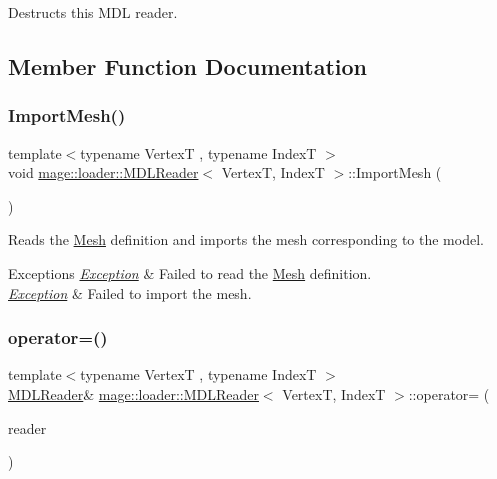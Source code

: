 Destructs this M\+DL reader. 

\subsection{Member Function Documentation}
\hypertarget{classmage_1_1loader_1_1_m_d_l_reader_a70ea21ef9309a867303875ad5b7669dc}{}\label{classmage_1_1loader_1_1_m_d_l_reader_a70ea21ef9309a867303875ad5b7669dc} 
\subsubsection{\texorpdfstring{Import\+Mesh()}{ImportMesh()}}
{\footnotesize\ttfamily template$<$typename VertexT , typename IndexT $>$ \\
void \hyperlink{classmage_1_1loader_1_1_m_d_l_reader}{mage\+::loader\+::\+M\+D\+L\+Reader}$<$ VertexT, IndexT $>$\+::Import\+Mesh (\begin{DoxyParamCaption}{ }\end{DoxyParamCaption})\hspace{0.3cm}{\ttfamily [private]}}

Reads the \hyperlink{classmage_1_1_mesh}{Mesh} definition and imports the mesh corresponding to the model.


\begin{DoxyExceptions}{Exceptions}
{\em \hyperlink{classmage_1_1_exception}{Exception}} & Failed to read the \hyperlink{classmage_1_1_mesh}{Mesh} definition. \\
\hline
{\em \hyperlink{classmage_1_1_exception}{Exception}} & Failed to import the mesh. \\
\hline
\end{DoxyExceptions}
\hypertarget{classmage_1_1loader_1_1_m_d_l_reader_ae5198668e854659b2187fac3a5717451}{}\label{classmage_1_1loader_1_1_m_d_l_reader_ae5198668e854659b2187fac3a5717451} 
\subsubsection{\texorpdfstring{operator=()}{operator=()}\hspace{0.1cm}{\footnotesize\ttfamily [1/2]}}
{\footnotesize\ttfamily template$<$typename VertexT , typename IndexT $>$ \\
\hyperlink{classmage_1_1loader_1_1_m_d_l_reader}{M\+D\+L\+Reader}\& \hyperlink{classmage_1_1loader_1_1_m_d_l_reader}{mage\+::loader\+::\+M\+D\+L\+Reader}$<$ VertexT, IndexT $>$\+::operator= (\begin{DoxyParamCaption}\item[{const \hyperlink{classmage_1_1loader_1_1_m_d_l_reader}{M\+D\+L\+Reader}$<$ VertexT, IndexT $>$ \&}]{reader }\end{DoxyParamCaption})\hspace{0.3cm}{\ttfamily [delete]}}

